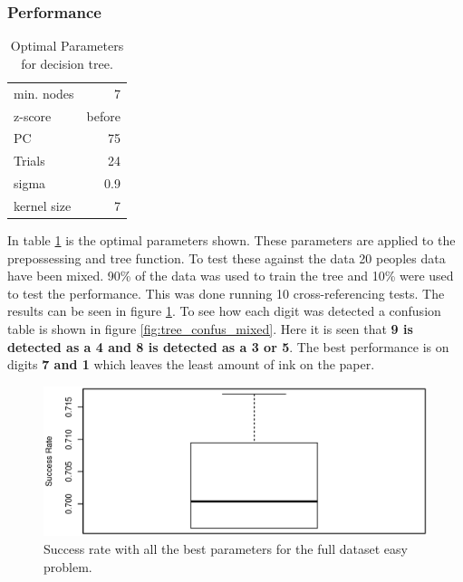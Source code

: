 \subsubsection{Performance}

\begin{table}[h]
\centering
\begin{tabular}{lr}
min. nodes  & 7      \\
z-score     & before \\
PC          & 75     \\
Trials      & 24     \\
sigma       & 0.9    \\
kernel size & 7      \\
\end{tabular}
\caption{Optimal Parameters for decision tree.}
\label{tb:tree_simply_the_best_parameters}
\end{table}


In table \ref{tb:tree_simply_the_best_parameters} is the optimal parameters shown.
These parameters are applied to the prepossessing and tree function.
To test these against the data 20 peoples data have been mixed.
90\% of the data was used to train the tree and 10\% were used to test the performance.
This was done running 10 cross-referencing tests. 
The results can be seen in figure \ref{fig:tree_performance_mixed}.
To see how each digit was detected a confusion table is shown in figure \ref{fig:tree_confus_mixed}. 
Here it is seen that \textbf{9 is detected as a 4 and 8 is detected as a 3 or 5}. 
The best performance is on digits \textbf{7 and 1} which leaves the least amount of ink on the paper.

\begin{figure}[H]
\centering
\includegraphics[width=\textwidth]{graphics/tree_performance_mix}
\caption{Success rate with all the best parameters for the full dataset easy problem.}
\label{fig:tree_performance_mixed}
\end{figure}


